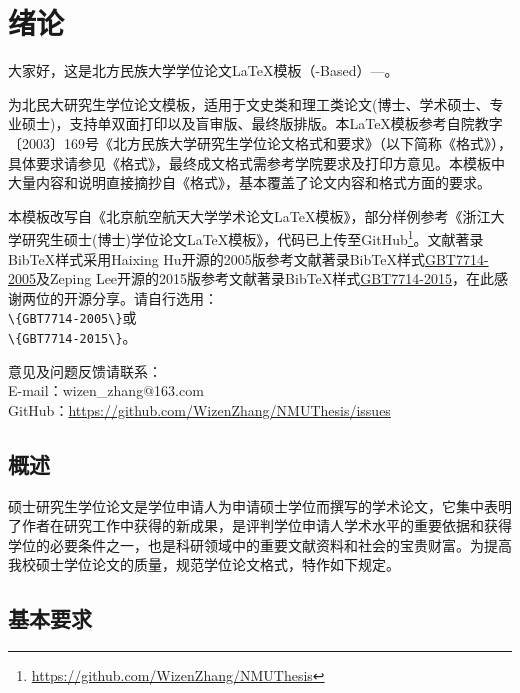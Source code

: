 \chapter{绪论}
大家好，这是北方民族大学学位论文\LaTeX{}模板（\CTeX{}-Based）---\NMUThesis{}。

\NMUThesis{}为北民大研究生学位论文模板，适用于文史类和理工类论文(博士、学术硕士、专业硕士)，支持单双面打印以及盲审版、最终版排版。本\LaTeX{}模板参考自院教字〔2003〕169号《北方民族大学研究生学位论文格式和要求》（以下简称《格式》），具体要求请参见《格式》，最终成文格式需参考学院要求及打印方意见。本模板中大量内容和说明直接摘抄自《格式》，基本覆盖了论文内容和格式方面的要求。

本模板改写自《北京航空航天大学学术论文\LaTeX{}模板》，部分样例参考《浙江大学研究生硕士(博士)学位论文\LaTeX{}模板》，代码已上传至GitHub\footnote{\href{https://github.com/WizenZhang/NMUThesis}{https://github.com/WizenZhang/NMUThesis}}。文献著录BibTeX样式采用Haixing Hu开源的2005版参考文献著录BibTeX样式\href{https://github.com/Haixing-Hu/GBT7714-2005-BibTeX-Style}{GBT7714-2005}及Zeping Lee开源的2015版参考文献著录BibTeX样式\href{https://github.com/zepinglee/gbt7714-bibtex-style}{GBT7714-2015}，在此感谢两位的开源分享。请自行选用：\\
\verb|\{GBT7714-2005\}|或\\
\verb|\{GBT7714-2015\}|。



意见及问题反馈请联系：\\
\indent E-mail：wizen\_zhang@163.com\\
\indent GitHub：\href{https://github.com/WizenZhang/NMUThesis/issues}{https://github.com/WizenZhang/NMUThesis/issues}

\section{概述}
硕士研究生学位论文是学位申请人为申请硕士学位而撰写的学术论文，它集中表明了作者在研究工作中获得的新成果，是评判学位申请人学术水平的重要依据和获得学位的必要条件之一，也是科研领域中的重要文献资料和社会的宝贵财富。为提高我校硕士学位论文的质量，规范学位论文格式，特作如下规定。

\section{基本要求}


